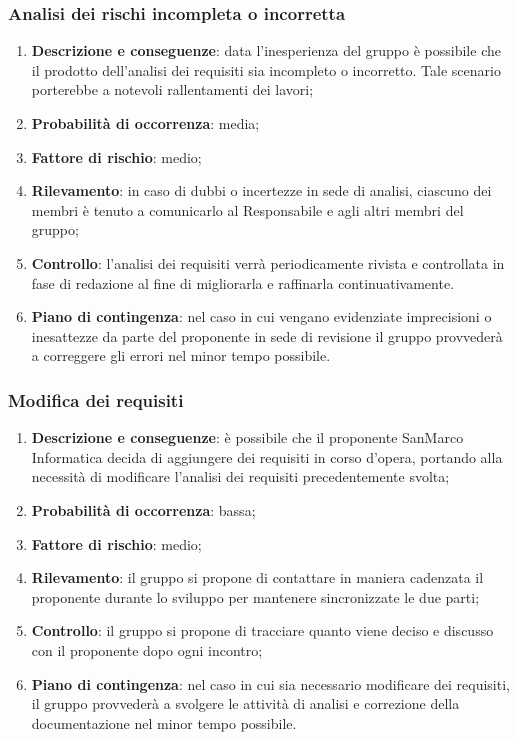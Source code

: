 	\subsubsection{Analisi dei rischi incompleta o incorretta}
	\begin{enumerate}
		\item \textbf{Descrizione e conseguenze}: data l'inesperienza del gruppo è possibile che il prodotto dell'analisi dei requisiti sia incompleto o incorretto. Tale scenario porterebbe a notevoli rallentamenti dei lavori;
		\item \textbf{Probabilità di occorrenza}: media;
		\item \textbf{Fattore di rischio}: medio;
		\item \textbf{Rilevamento}: in caso di dubbi o incertezze in sede di analisi, ciascuno dei membri è tenuto a comunicarlo al Responsabile e agli altri membri del gruppo;		
		\item \textbf{Controllo}: l'analisi dei requisiti verrà periodicamente rivista e controllata in fase di redazione al fine di migliorarla e raffinarla continuativamente.
		\item \textbf{Piano di contingenza}: nel caso in cui vengano evidenziate imprecisioni o inesattezze da parte del proponente in sede di revisione il gruppo provvederà a correggere gli errori nel minor tempo possibile.
	\end{enumerate}
	
	\subsubsection{Modifica dei requisiti}
	\begin{enumerate}
		\item \textbf{Descrizione e conseguenze}: è possibile che il proponente SanMarco Informatica decida di aggiungere dei requisiti in corso d'opera, portando alla necessità di modificare l'analisi dei requisiti precedentemente svolta; 
		\item \textbf{Probabilità di occorrenza}: bassa;
		\item \textbf{Fattore di rischio}: medio;
		\item \textbf{Rilevamento}: il gruppo si propone di contattare in maniera cadenzata il proponente durante lo sviluppo per mantenere sincronizzate le due parti;
		\item \textbf{Controllo}: il gruppo si propone di tracciare quanto viene deciso e discusso con il proponente dopo ogni incontro;
		\item \textbf{Piano di contingenza}: nel caso in cui sia necessario modificare dei requisiti, il gruppo provvederà a svolgere le attività di analisi e correzione della documentazione nel minor tempo possibile.
	\end{enumerate}	
	
